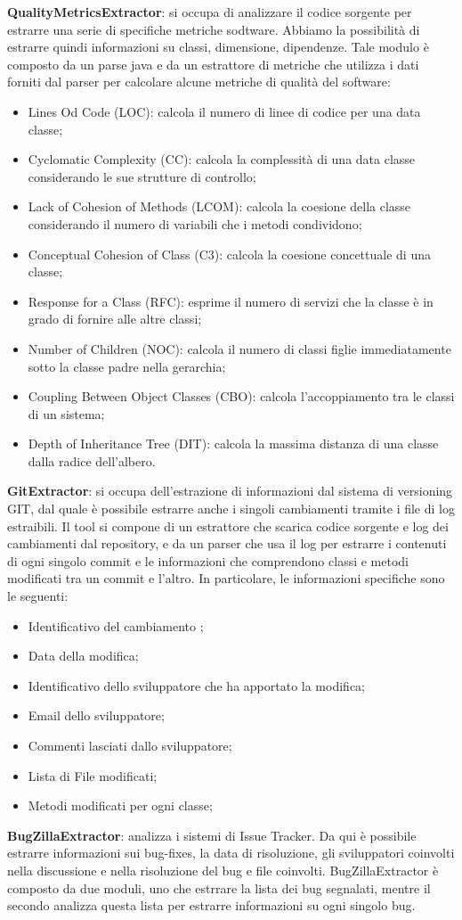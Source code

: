 \textbf{QualityMetricsExtractor}: si occupa di analizzare il codice sorgente per estrarre una serie di specifiche metriche sodtware. Abbiamo la possibilità di estrarre quindi informazioni su classi, dimensione, dipendenze. Tale modulo è composto da un parse java e da un estrattore di metriche che utilizza i dati forniti dal parser per calcolare alcune metriche di qualità del software:
\begin{itemize}
\item Lines Od Code (LOC): calcola il numero di linee di codice per una data classe;
\item Cyclomatic Complexity (CC): calcola la complessità di una data classe considerando le sue strutture di controllo;
\item Lack of Cohesion of Methods (LCOM): calcola la coesione della classe considerando il numero di variabili che i metodi condividono;
\item Conceptual Cohesion of Class (C3): calcola la coesione concettuale di una classe;
\item Response for a Class (RFC): esprime il numero di servizi che la classe è in grado di fornire alle altre classi;
\item Number of Children (NOC): calcola il numero di classi figlie immediatamente sotto la classe padre nella gerarchia;
\item Coupling Between Object Classes (CBO): calcola l'accoppiamento tra le classi di un sistema;
\item Depth of Inheritance Tree (DIT): calcola la massima distanza di una classe dalla radice dell'albero.
\end{itemize}

\textbf{GitExtractor}: si occupa dell'estrazione di informazioni dal sistema di versioning GIT, dal quale è possibile estrarre anche i singoli cambiamenti tramite i file di log estraibili. Il tool si compone di un estrattore che scarica codice sorgente e log dei cambiamenti dal repository, e da un parser che usa il log per estrarre i contenuti di ogni singolo commit e le informazioni che comprendono classi e metodi modificati tra un commit e l'altro. In particolare, le informazioni specifiche sono le seguenti:
\begin{itemize}
\item Identificativo del cambiamento ;
\item Data della modifica;
\item Identificativo dello sviluppatore che ha apportato la modifica;
\item Email dello sviluppatore;
\item Commenti lasciati dallo sviluppatore;
\item Lista di File modificati;
\item Metodi modificati per ogni classe;
\end{itemize}

\textbf{BugZillaExtractor}: analizza i sistemi di Issue Tracker. Da qui è possibile estrarre informazioni sui bug-fixes, la data di risoluzione, gli sviluppatori coinvolti nella discussione e nella risoluzione del bug e file coinvolti. BugZillaExtractor è composto da due moduli, uno che estrrare la lista dei bug segnalati, mentre il secondo analizza questa lista per estrarre informazioni su ogni singolo bug.